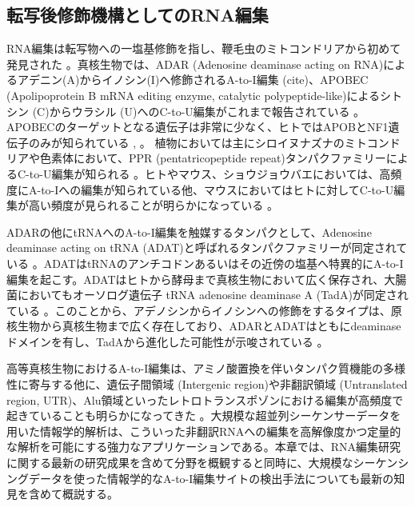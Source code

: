 \subsection{転写後修飾機構としてのRNA編集}
RNA編集は転写物への一塩基修飾を指し、鞭毛虫のミトコンドリアから初めて発見された \citep{BenVanBra8609}。真核生物では、ADAR (Adenosine deaminase acting on RNA)によるアデニン(A)からイノシン(I)へ修飾されるA-to-I編集 (cite)、APOBEC (Apolipoprotein B mRNA editing enzyme, catalytic polypeptide-like)によるシトシン (C)からウラシル (U)へのC-to-U編集がこれまで報告されている \citep{BenVanBra8609}。APOBECのターゲットとなる遺伝子は非常に少なく、ヒトではAPOBとNF1遺伝子のみが知られている \citep{CapFreSku9702}, 。
植物においては主にシロイヌナズナのミトコンドリアや色素体において、PPR (pentatricopeptide repeat)タンパクファミリーによるC-to-U編集が知られる \citep{Shi0603, MenCheJin10}。ヒトやマウス、ショウジョウバエにおいては、高頻度にA-to-Iへの編集が知られている他、マウスにおいてはヒトに対してC-to-U編集が高い頻度が見られることが明らかになっている \citep{Danecek:2012aa, Gu:2012aa}。
\par
ADARの他にtRNAへのA-to-I編集を触媒するタンパクとして、Adenosine deaminase acting on tRNA (ADAT)と呼ばれるタンパクファミリーが同定されている \citep{MaaGerRic9908}。ADATはtRNAのアンチコドンあるいはその近傍の塩基へ特異的にA-to-I編集を起こす。ADATはヒトから酵母まで真核生物において広く保存され、大腸菌においてもオーソログ遺伝子 tRNA adenosine deaminase A (TadA)が同定されている \citep{WolGerKel0207}。このことから、アデノシンからイノシンへの修飾をするタイプは、原核生物から真核生物まで広く存在しており、ADARとADATはともにdeaminaseドメインを有し、TadAから進化した可能性が示唆されている \citep{GerKel0106}。
\par
高等真核生物におけるA-to-I編集は、アミノ酸置換を伴いタンパク質機能の多様性に寄与する他に、遺伝子間領域 (Intergenic region)や非翻訳領域 (Untranslated region, UTR)、Alu領域といったレトロトランスポゾンにおける編集が高頻度で起きていることも明らかになってきた \citep{pmid22484847, Bazak:2013aa}。大規模な超並列シーケンサーデータを用いた情報学的解析は、こういった非翻訳RNAへの編集を高解像度かつ定量的な解析を可能にする強力なアプリケーションである。本章では、RNA編集研究に関する最新の研究成果を含めて分野を概観すると同時に、大規模なシーケンシングデータを使った情報学的なA-to-I編集サイトの検出手法についても最新の知見を含めて概説する。

